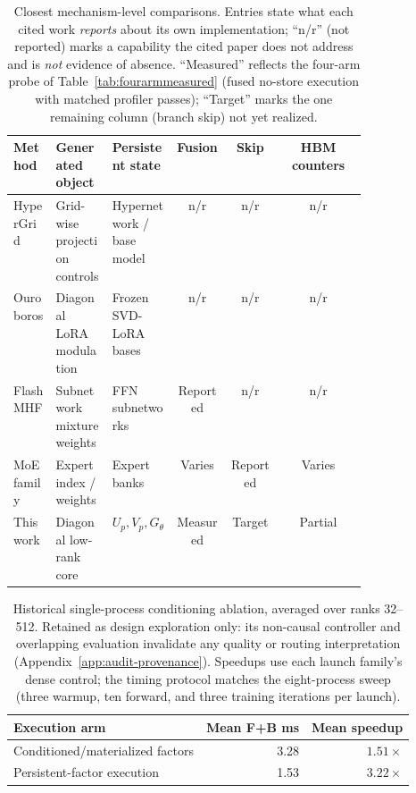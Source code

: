 \begin{table}[h]
\centering
\caption{Closest mechanism-level comparisons.  Entries state what each
cited work \emph{reports} about its own implementation; ``n/r'' (not
reported) marks a capability the cited paper does not address and is
\emph{not} evidence of absence.  ``Measured'' reflects the four-arm probe
of Table~\ref{tab:fourarmmeasured} (fused no-store execution with matched
profiler passes); ``Target'' marks the one remaining column (branch skip)
not yet realized.}
\label{tab:positioning}
\begin{tabular}{>{\raggedright\arraybackslash}p{0.12\linewidth}>{\raggedright\arraybackslash}p{0.16\linewidth}>{\raggedright\arraybackslash}p{0.18\linewidth}ccc}
\toprule
Method & Generated object & Persistent state & Fusion & Skip & HBM counters \\
\midrule
HyperGrid & Grid-wise projection controls & Hypernetwork / base model & n/r & n/r & n/r \\
Ouroboros & Diagonal LoRA modulation & Frozen SVD-LoRA bases & n/r & n/r & n/r \\
FlashMHF & Subnetwork mixture weights & FFN subnetworks & Reported & n/r & n/r \\
MoE family & Expert index / weights & Expert banks & Varies & Reported & Varies \\
This work & Diagonal low-rank core & $U_p,V_p,G_\theta$ & Measured & Target & Partial \\
\bottomrule
\end{tabular}
\end{table}



\begin{table}[h]
\centering
\caption{Historical single-process conditioning ablation, averaged over
ranks 32--512.  Retained as design exploration only: its non-causal
controller and overlapping evaluation invalidate any quality or routing
interpretation (Appendix~\ref{app:audit-provenance}).  Speedups use each
launch family's dense control; the timing
protocol matches the eight-process sweep (three warmup, ten forward, and
three training iterations per launch).}
\label{tab:lifetimeablation}
\begin{tabular}{lrr}
\toprule
Execution arm & Mean F+B ms & Mean speedup \\
\midrule
Conditioned/materialized factors & 3.28 & $1.51\times$ \\
Persistent-factor execution & 1.53 & $3.22\times$ \\
\bottomrule
\end{tabular}
\end{table}

